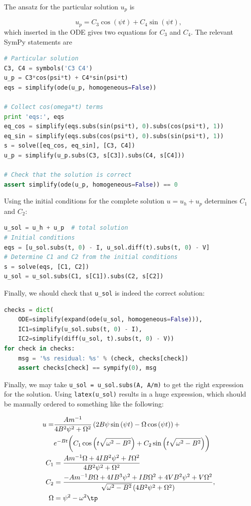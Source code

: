 \documentclass[graybox,envcountchap,sectrefs,final]{svmonodo}
\begin{document}
The ansatz for the particular solution $u_p$ is

\[ u_p= C_3\cos(\psi t) + C_4\sin(\psi t),\]
which inserted in the ODE gives two equations
for $C_3$ and $C_4$. The relevant SymPy statements are

\begin{lstlisting}[language=Python,style=graycolor]
# Particular solution
C3, C4 = symbols('C3 C4')
u_p = C3*cos(psi*t) + C4*sin(psi*t)
eqs = simplify(ode(u_p, homogeneous=False))

# Collect cos(omega*t) terms
print 'eqs:', eqs
eq_cos = simplify(eqs.subs(sin(psi*t), 0).subs(cos(psi*t), 1))
eq_sin = simplify(eqs.subs(cos(psi*t), 0).subs(sin(psi*t), 1))
s = solve([eq_cos, eq_sin], [C3, C4])
u_p = simplify(u_p.subs(C3, s[C3]).subs(C4, s[C4]))

# Check that the solution is correct
assert simplify(ode(u_p, homogeneous=False)) == 0
\end{lstlisting}
Using the initial conditions for the complete solution $u=u_h+u_p$
determines $C_1$ and $C_2$:

\begin{lstlisting}[language=Python,style=graycolor]
u_sol = u_h + u_p  # total solution
# Initial conditions
eqs = [u_sol.subs(t, 0) - I, u_sol.diff(t).subs(t, 0) - V]
# Determine C1 and C2 from the initial conditions
s = solve(eqs, [C1, C2])
u_sol = u_sol.subs(C1, s[C1]).subs(C2, s[C2])
\end{lstlisting}
Finally, we should check that \Verb!u_sol! is indeed the correct solution:

\begin{lstlisting}[language=Python,style=graycolor]
checks = dict(
    ODE=simplify(expand(ode(u_sol, homogeneous=False))),
    IC1=simplify(u_sol.subs(t, 0) - I),
    IC2=simplify(diff(u_sol, t).subs(t, 0) - V))
for check in checks:
    msg = '%s residual: %s' % (check, checks[check])
    assert checks[check] == sympify(0), msg
\end{lstlisting}
Finally, we may take \Verb!u_sol = u_sol.subs(A, A/m)! to get the right
expression for the solution.
Using \Verb!latex(u_sol)! results in a huge expression, which should be
manually ordered to something like the following:

\begin{align*} u = &
\frac{Am^{-1}}{4 B^{2} \psi^{2} +
\Omega^{2}} \left(2 B \psi
\sin{\left (\psi t \right )} - \Omega\cos{\left (\psi t \right )}\right) + \\ 
&
{e^{-B t}} \biggl(
C_1 \cos{\left( t \sqrt{\omega^{2}- B^{2}}\right)} +
C_2 \sin{\left (t \sqrt{\omega^{2}- B^{2}}\right )}\biggr)\\ 
C_1 &= \frac{Am^{-1} \Omega + 4 I B^{2} \psi^{2} +
I\Omega^2}{
4 B^{2} \psi^{2} + \Omega^2}\\ 
C_2 &=
\frac{- Am^{-1} B\Omega + 4 I B^{3} \psi^{2} +
I B\Omega^2 + 4 V B^{2}\psi^{2} +
V\Omega^2}{
\sqrt{\omega^{2} - B^{2}}
\left(4 B^{2} \psi^{2} + \Omega^2\right)},\\ 
\Omega &= \psi^2 - \omega^2\tp
\end{align*}
\end{document}
